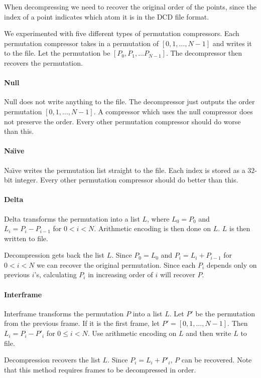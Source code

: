 \documentclass{report}
\begin{document}
When decompressing we need to recover the original order of the points, since
the index of a point indicates which atom it is in the DCD file format.

We experimented with five different types of permutation compressors. Each
permutation compressor takes in a permutation of $[0,1,\dots,N-1]$ and writes
it to the file. Let the permutation be $[P_0, P_1, \dots P_{N-1}]$.  The
decompressor then recovers the permutation.

\paragraph{Null}
Null does not write anything to the file. The decompressor just outputs the
order permutation $[0,1,\dots,N-1]$. A compressor which uses the null
compressor does not preserve the order. Every other permutation compressor
should do worse than this.

\paragraph{Na\"{\i}ve}
Na\"{\i}ve writes the permutation list straight to the file. Each index is
stored as a $32$-bit integer. Every other permutation compressor should do
better than this.

\paragraph{Delta}
Delta transforms the permutation into a list $L$, where $L_0 = P_0$ and $L_i =
P_i - P_{i-1}$ for $0 < i < N$. Arithmetic encoding is then done on $L$. $L$
is then written to file.

Decompression gets back the list $L$. Since $P_0 = L_0$ and $P_i = L_i +
P_{i-1}$ for $0 < i < N$ we can recover the original permutation. Since each
$P_i$ depends only on previous $i$'s, calculating $P_i$ in increasing order of
$i$ will recover $P$.

\paragraph{Interframe}
Interframe transforms the permutation $P$ into a list $L$. Let $P'$ be the
permutation from the previous frame. If it is the first frame, let $P' =
[0,1,\dots,N-1]$. Then $L_i = P_i - P'_i$ for $0 \le i < N$. Use arithmetic
encoding on $L$ and then write $L$ to file.

Decompression recovers the list $L$. Since $P_i = L_i + P'_i$, $P$ can be
recovered. Note that this method requires frames to be decompressed in order.
\end{document}
